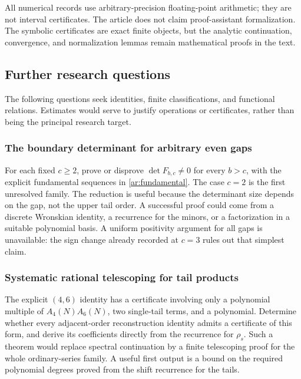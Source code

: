 \documentclass[11pt,a4paper]{article}
\numberwithin{equation}{section}
\theoremstyle{definition}
\theoremstyle{remark}
\begin{document}
All numerical records use arbitrary-precision floating-point arithmetic;
they are not interval certificates. The article does not claim
proof-assistant formalization. The symbolic certificates are exact
finite objects, but the analytic continuation, convergence, and
normalization lemmas remain mathematical proofs in the text.

\subsection{Further research questions}
\label{audit:questions}

The following questions seek identities, finite classifications, and
functional relations. Estimates would serve to justify operations or
certificates, rather than being the principal research target.

\subsubsection{The boundary determinant for arbitrary even gaps}

For each fixed $c\ge2$, prove or disprove
$\det F_{b,c}\ne0$ for every $b>c$, with the explicit fundamental
sequences in \eqref{ar:fundamental}. The case $c=2$ is the first
unresolved family. The reduction is useful because the determinant size
depends on the gap, not the upper tail order. A successful proof could
come from a discrete Wronskian identity, a recurrence for the minors,
or a factorization in a suitable polynomial basis. A uniform positivity
argument for all gaps is unavailable: the sign change already recorded
at $c=3$ rules out that simplest claim.

\subsubsection{Systematic rational telescoping for tail products}

The explicit $(4,6)$ identity has a certificate involving only a
polynomial multiple of $A_4(N)A_6(N)$, two single-tail terms, and a
polynomial. Determine whether every adjacent-order reconstruction
identity admits a certificate of this form, and derive its coefficients
directly from the recurrence for $\rho_s$. Such a theorem would replace
spectral continuation by a finite telescoping proof for the whole
ordinary-series family. A useful first output is a bound on the required
polynomial degrees proved from the shift recurrence for the tails.
\end{document}
